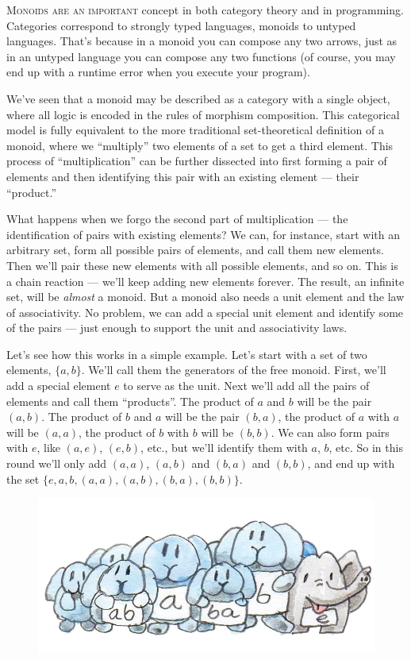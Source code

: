 
\lettrine[lhang=0.17]{M}{onoids are an important} concept in both category theory and in
programming. Categories correspond to strongly typed languages, monoids
to untyped languages. That's because in a monoid you can compose any two
arrows, just as in an untyped language you can compose any two functions
(of course, you may end up with a runtime error when you execute your
program).

We've seen that a monoid may be described as a category with a single
object, where all logic is encoded in the rules of morphism composition.
This categorical model is fully equivalent to the more traditional
set-theoretical definition of a monoid, where we ``multiply'' two
elements of a set to get a third element. This process of
``multiplication'' can be further dissected into first forming a pair of
elements and then identifying this pair with an existing element ---
their ``product.''

What happens when we forgo the second part of multiplication --- the
identification of pairs with existing elements? We can, for instance,
start with an arbitrary set, form all possible pairs of elements, and
call them new elements. Then we'll pair these new elements with all
possible elements, and so on. This is a chain reaction --- we'll keep
adding new elements forever. The result, an infinite set, will be
\emph{almost} a monoid. But a monoid also needs a unit element and the
law of associativity. No problem, we can add a special unit element and
identify some of the pairs --- just enough to support the unit and
associativity laws.

Let's see how this works in a simple example. Let's start with a set of
two elements, $\{a, b\}$. We'll call them the generators of the
free monoid. First, we'll add a special element $e$ to serve as
the unit. Next we'll add all the pairs of elements and call them
``products''. The product of $a$ and $b$ will be the pair
$(a, b)$. The product of $b$ and $a$ will be the
pair $(b, a)$, the product of $a$ with $a$ will be
$(a, a)$, the product of $b$ with $b$ will be
$(b, b)$. We can also form pairs with $e$, like
$(a, e)$, $(e, b)$, etc., but we'll identify them with
$a$, $b$, etc. So in this round we'll only add
$(a, a)$, $(a, b)$ and $(b, a)$ and
$(b, b)$, and end up with the set
$\{e, a, b, (a, a), (a, b), (b, a), (b, b)\}$.

\begin{figure}[H]
\centering
\includegraphics[width=\textwidth]{images/bunnies.jpg}
\end{figure}

